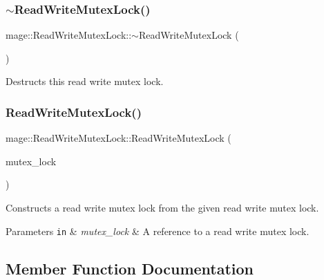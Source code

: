 \subsubsection{\texorpdfstring{$\sim$\+Read\+Write\+Mutex\+Lock()}{~ReadWriteMutexLock()}}
{\footnotesize\ttfamily mage\+::\+Read\+Write\+Mutex\+Lock\+::$\sim$\+Read\+Write\+Mutex\+Lock (\begin{DoxyParamCaption}{ }\end{DoxyParamCaption})}

Destructs this read write mutex lock. \hypertarget{structmage_1_1_read_write_mutex_lock_a5c040abe418a5d4d3a15420503568529}{}\label{structmage_1_1_read_write_mutex_lock_a5c040abe418a5d4d3a15420503568529} 
\subsubsection{\texorpdfstring{Read\+Write\+Mutex\+Lock()}{ReadWriteMutexLock()}\hspace{0.1cm}{\footnotesize\ttfamily [2/2]}}
{\footnotesize\ttfamily mage\+::\+Read\+Write\+Mutex\+Lock\+::\+Read\+Write\+Mutex\+Lock (\begin{DoxyParamCaption}\item[{const \hyperlink{structmage_1_1_read_write_mutex_lock}{Read\+Write\+Mutex\+Lock} \&}]{mutex\+\_\+lock }\end{DoxyParamCaption})\hspace{0.3cm}{\ttfamily [private]}}

Constructs a read write mutex lock from the given read write mutex lock.


\begin{DoxyParams}[1]{Parameters}
\mbox{\tt in}  & {\em mutex\+\_\+lock} & A reference to a read write mutex lock. \\
\hline
\end{DoxyParams}


\subsection{Member Function Documentation}
\hypertarget{structmage_1_1_read_write_mutex_lock_ad3292e579d09107c7361989657b9bade}{}\label{structmage_1_1_read_write_mutex_lock_ad3292e579d09107c7361989657b9bade} 

